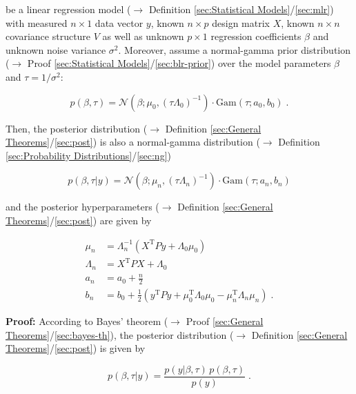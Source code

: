\documentclass[a4paper,12pt,twoside]{book}
\begin{document}
be a linear regression model ($\rightarrow$ Definition \ref{sec:Statistical Models}/\ref{sec:mlr}) with measured $n \times 1$ data vector $y$, known $n \times p$ design matrix $X$, known $n \times n$ covariance structure $V$ as well as unknown $p \times 1$ regression coefficients $\beta$ and unknown noise variance $\sigma^2$. Moreover, assume a normal-gamma prior distribution ($\rightarrow$ Proof \ref{sec:Statistical Models}/\ref{sec:blr-prior}) over the model parameters $\beta$ and $\tau = 1/\sigma^2$:

\begin{equation} \label{eq:blr-post-GLM-NG-prior}
p(\beta,\tau) = \mathcal{N}(\beta; \mu_0, (\tau \Lambda_0)^{-1}) \cdot \mathrm{Gam}(\tau; a_0, b_0) \; .
\end{equation}

Then, the posterior distribution ($\rightarrow$ Definition \ref{sec:General Theorems}/\ref{sec:post}) is also a normal-gamma distribution ($\rightarrow$ Definition \ref{sec:Probability Distributions}/\ref{sec:ng})

\begin{equation} \label{eq:blr-post-GLM-NG-post}
p(\beta,\tau|y) = \mathcal{N}(\beta; \mu_n, (\tau \Lambda_n)^{-1}) \cdot \mathrm{Gam}(\tau; a_n, b_n)
\end{equation}

and the posterior hyperparameters ($\rightarrow$ Definition \ref{sec:General Theorems}/\ref{sec:post}) are given by

\begin{equation} \label{eq:blr-post-GLM-NG-post-par}
\begin{split}
\mu_n &= \Lambda_n^{-1} (X^\mathrm{T} P y + \Lambda_0 \mu_0) \\
\Lambda_n &= X^\mathrm{T} P X + \Lambda_0 \\
a_n &= a_0 + \frac{n}{2} \\
b_n &= b_0 + \frac{1}{2} (y^\mathrm{T} P y + \mu_0^\mathrm{T} \Lambda_0 \mu_0 - \mu_n^\mathrm{T} \Lambda_n \mu_n) \; .
\end{split}
\end{equation}


\vspace{1em}
\textbf{Proof:} According to Bayes' theorem ($\rightarrow$ Proof \ref{sec:General Theorems}/\ref{sec:bayes-th}), the posterior distribution ($\rightarrow$ Definition \ref{sec:General Theorems}/\ref{sec:post}) is given by

\begin{equation} \label{eq:blr-post-GLM-NG-BT}
p(\beta,\tau|y) = \frac{p(y|\beta,\tau) \, p(\beta,\tau)}{p(y)} \; .
\end{equation}
\end{document}
